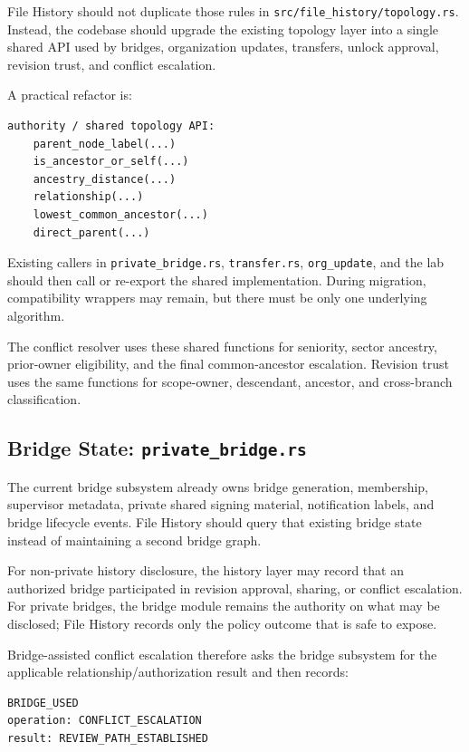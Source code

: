 \documentclass[11pt]{article}
\begin{document}
File History should not duplicate those rules in \texttt{src/file\_history/topology.rs}. Instead, the codebase should upgrade the existing topology layer into a single shared API used by bridges, organization updates, transfers, unlock approval, revision trust, and conflict escalation.

A practical refactor is:

\begin{lstlisting}
authority / shared topology API:
    parent_node_label(...)
    is_ancestor_or_self(...)
    ancestry_distance(...)
    relationship(...)
    lowest_common_ancestor(...)
    direct_parent(...)
\end{lstlisting}

Existing callers in \texttt{private\_bridge.rs}, \texttt{transfer.rs}, \texttt{org\_update}, and the lab should then call or re-export the shared implementation. During migration, compatibility wrappers may remain, but there must be only one underlying algorithm.

The conflict resolver uses these shared functions for seniority, sector ancestry, prior-owner eligibility, and the final common-ancestor escalation. Revision trust uses the same functions for scope-owner, descendant, ancestor, and cross-branch classification.

\subsection{Bridge State: \texttt{private\_bridge.rs}}

The current bridge subsystem already owns bridge generation, membership, supervisor metadata, private shared signing material, notification labels, and bridge lifecycle events. File History should query that existing bridge state instead of maintaining a second bridge graph.

For non-private history disclosure, the history layer may record that an authorized bridge participated in revision approval, sharing, or conflict escalation. For private bridges, the bridge module remains the authority on what may be disclosed; File History records only the policy outcome that is safe to expose.

Bridge-assisted conflict escalation therefore asks the bridge subsystem for the applicable relationship/authorization result and then records:

\begin{lstlisting}
BRIDGE_USED
operation: CONFLICT_ESCALATION
result: REVIEW_PATH_ESTABLISHED
\end{lstlisting}
\end{document}

